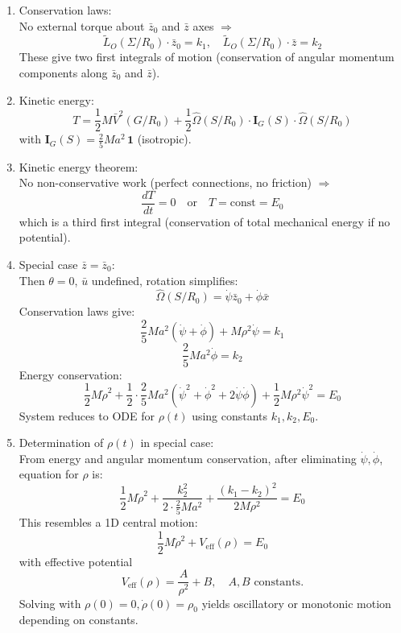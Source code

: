 \documentclass[12pt]{article}
\begin{document}
\begin{answerbox}
\begin{enumerate}
    \item Conservation laws: \\
    No external torque about \( \bar{z}_0 \) and \( \bar{z} \) axes \(\Rightarrow\)
    \[
        \tilde{L}_O(\Sigma/R_0) \cdot \bar{z}_0 = k_1, \quad
        \tilde{L}_O(\Sigma/R_0) \cdot \bar{z} = k_2
    \]
    These give two first integrals of motion (conservation of angular momentum components along \( \bar{z}_0 \) and \( \bar{z} \)).

    \item Kinetic energy:
    \[
        T = \frac{1}{2} M \bar{V}^2(G/R_0) + \frac{1}{2} \hat{\Omega}(S/R_0) \cdot \mathbf{I}_G(S) \cdot \hat{\Omega}(S/R_0)
    \]
    with \( \mathbf{I}_G(S) = \frac{2}{5} M a^2 \, \mathbf{1} \) (isotropic).

    \item Kinetic energy theorem: \\
    No non-conservative work (perfect connections, no friction) \(\Rightarrow\)
    \[
        \frac{dT}{dt} = 0 \quad \text{or} \quad T = \text{const} = E_0
    \]
    which is a third first integral (conservation of total mechanical energy if no potential).

    \item Special case \( \bar{z} = \bar{z}_0 \): \\
    Then \( \theta = 0\), \( \bar{u} \) undefined, rotation simplifies:
    \[
        \hat{\Omega}(S/R_0) = \dot{\psi} \bar{z}_0 + \dot{\phi} \bar{x}
    \]
    Conservation laws give:
    \[
        \frac{2}{5} M a^2 (\dot{\psi} + \dot{\phi}) + M \rho^2 \dot{\psi} = k_1
    \]
    \[
        \frac{2}{5} M a^2 \dot{\phi} = k_2
    \]
    Energy conservation:
    \[
        \frac{1}{2} M \dot{\rho}^2 + \frac{1}{2} \cdot \frac{2}{5} M a^2 (\dot{\psi}^2 + \dot{\phi}^2 + 2\dot{\psi}\dot{\phi}) + \frac{1}{2} M \rho^2 \dot{\psi}^2 = E_0
    \]
    System reduces to ODE for \( \rho(t) \) using constants \( k_1, k_2, E_0 \).

    \item[11.] Determination of \( \rho(t) \) in special case: \\
    From energy and angular momentum conservation, after eliminating \( \dot{\psi}, \dot{\phi} \), equation for \( \rho \) is:
    \[
        \frac{1}{2} M \dot{\rho}^2 + \frac{k_2^2}{2 \cdot \frac{2}{5} M a^2} + \frac{(k_1 - k_2)^2}{2M \rho^2} = E_0
    \]
    This resembles a 1D central motion:
    \[
        \frac{1}{2} M \dot{\rho}^2 + V_{\text{eff}}(\rho) = E_0
    \]
    with effective potential
    \[
        V_{\text{eff}}(\rho) = \frac{A}{\rho^2} + B, \quad A, B \text{ constants}.
    \]
    Solving with \( \rho(0) = 0, \dot{\rho}(0) = \rho_0 \) yields oscillatory or monotonic motion depending on constants.
\end{enumerate}
\end{answerbox}

\end{document}
